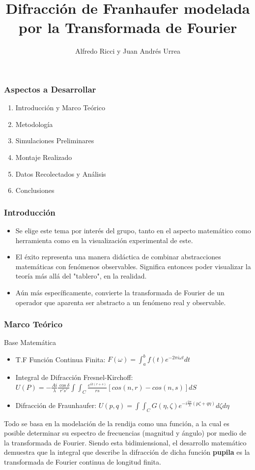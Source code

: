 \documentclass[12pt]{beamer}
\title{Difracción de Franhaufer modelada por la Transformada de Fourier}
\author{Alfredo Ricci y Juan Andrés Urrea}
\begin{document}
\frame{\titlepage}
\begin{frame}
\frametitle{Aspectos a Desarrollar}
\begin{block}{}
\begin{enumerate}
\item Introducción y Marco Teórico
\item Metodología
\item Simulaciones Preliminares
\item Montaje Realizado
\item Datos Recolectados y Análisis 
\item Conclusiones
\end{enumerate}
\end{block}
\end{frame}

\begin{frame}
\frametitle{Introducción}
\begin{block}{}
\begin{itemize}
\item Se elige este tema por interés del grupo, tanto en el aspecto matemático como herramienta como en la visualización experimental de este.
\item El éxito representa una manera didáctica de combinar abstracciones matemáticas con fenómenos observables. Significa entonces poder visualizar la teoría más allá del "tablero", en la realidad.
\item Aún más específicamente, convierte la transformada de Fourier de un operador que aparenta ser abstracto a un fenómeno real y observable.
\end{itemize}
\end{block}
\end{frame}

\begin{frame}
\frametitle{Marco Teórico}
\begin{block}{Base Matemática}
\begin{itemize}
\item T.F Función Continua Finita: $F(\omega)=\int_{a}^{b} f(t)e^{-2\pi i \omega t}dt$
\item Integral de Difracción Fresnel-Kirchoff: $U(P)=-\frac{Ai}{\lambda}\frac{\cos \delta}{r\prime s\prime}\int \int_C\frac{e^{ik(r+s)}}{rs}[cos(n,r)-cos(n,s)]dS $
\item Difracción de Fraunhaufer: $U(p,q)=\int \int_C G(\eta,\zeta) e^{-i\frac{2\pi}{\lambda}(p\zeta + q\eta)}d\zeta d\eta$
\end{itemize}
\end{block}
Todo se basa en la modelación de la rendija como una función, a la cual es posible determinar su espectro de frecuencias (magnitud y ángulo) por medio de la transformada de Fourier. Siendo esta bidimiensional, el desarrollo matemático demuestra que la integral que describe la difracción de dicha función \textbf{pupila} es la transformada de Fourier continua de longitud finita.
\end{frame}
\end{document}
